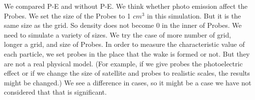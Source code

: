 

We compared P-E and without P-E. We think whether photo emission affect the Probes.
We set the size of the Probes to 1 $cm^3$ in this simulation. But it is the same size as the grid. So density does not become 0 in the inner of Probes. We need to simulate a variety of sizes. We try the case of more number of grid, longer a grid, and size of Probes.
In order to measure the characteristic value of each particle, we set probes in the place that the wake is formed or not. But they are not a real physical model. (For example, if we give probes the photoelectric effect or if we change the size of satellite and probes to realistic scales, the results might be changed.)
We see a difference in cases, so it might be a case we have not considered that that is significant.

